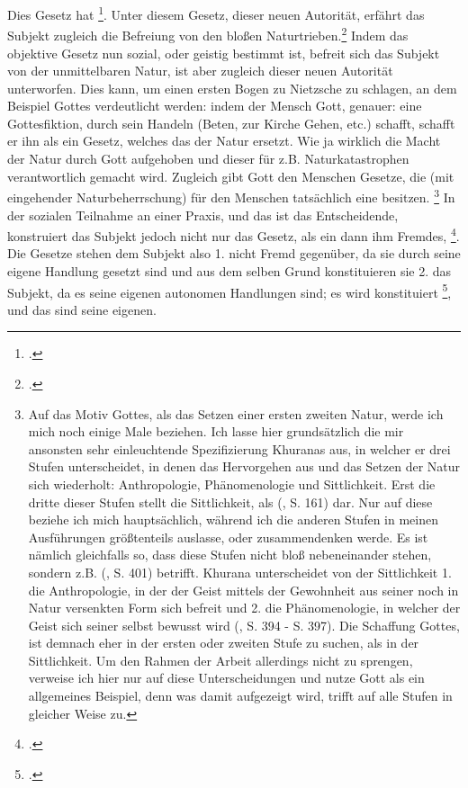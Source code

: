 \documentclass[12pt, a4paper, openany]{report}
\begin{document}
Dies Gesetz hat \footcite[][§146, S. 164.]{hegel_grundlinien_2017}.
Unter diesem Gesetz, dieser neuen Autorität, erfährt das Subjekt zugleich die Befreiung von den bloßen Naturtrieben.\footcite[Vlg.][§149, S. 164]{hegel_grundlinien_2017} 
Indem das objektive Gesetz nun sozial, oder geistig bestimmt ist, befreit sich das Subjekt von der unmittelbaren Natur, ist aber zugleich dieser neuen Autorität unterworfen. 
Dies kann, um einen ersten Bogen zu Nietzsche zu schlagen, an dem Beispiel Gottes verdeutlicht werden: 
indem der Mensch Gott, genauer: eine Gottesfiktion, durch sein Handeln (Beten, zur Kirche Gehen, etc.) schafft, schafft er ihn als ein Gesetz, welches das der Natur ersetzt. 
Wie ja wirklich die Macht der Natur durch Gott aufgehoben und dieser für z.B. Naturkatastrophen verantwortlich gemacht wird.
Zugleich gibt Gott den Menschen Gesetze, die (mit eingehender Naturbeherrschung) für den Menschen tatsächlich eine  besitzen.
\footnote{
    Auf das Motiv Gottes, als das Setzen einer ersten zweiten Natur, werde ich mich noch einige Male beziehen. 
    Ich lasse hier grundsätzlich die mir ansonsten sehr einleuchtende Spezifizierung Khuranas aus, in welcher er drei Stufen unterscheidet, in denen das Hervorgehen aus und das Setzen der Natur sich wiederholt: Anthropologie, Phänomenologie und Sittlichkeit.
    Erst die dritte dieser Stufen stellt die Sittlichkeit, als  (\cite{hegel_grundlinien_2017}, S. 161) dar.
    Nur auf diese beziehe ich mich hauptsächlich, während ich die anderen Stufen in meinen Ausführungen größtenteils auslasse, oder zusammendenken werde. 
    Es ist nämlich gleichfalls so, dass diese Stufen nicht bloß nebeneinander stehen, sondern z.B.  (\cite{khurana_freiheit_2017}, S. 401) betrifft.
    Khurana unterscheidet von der Sittlichkeit 1. die Anthropologie, in der der Geist mittels der Gewohnheit aus seiner noch in Natur versenkten Form sich befreit und 2. die Phänomenologie, in welcher der Geist sich seiner selbst bewusst wird (\cite{khurana_freiheit_2017}, S. 394 - S. 397).
    Die Schaffung Gottes, ist demnach eher in der ersten oder zweiten Stufe zu suchen, als in der Sittlichkeit. 
    Um den Rahmen der Arbeit allerdings nicht zu sprengen, verweise ich hier nur auf diese Unterscheidungen und nutze Gott als ein allgemeines Beispiel, denn was damit aufgezeigt wird, trifft auf alle Stufen in gleicher Weise zu. 
}
In der sozialen Teilnahme an einer Praxis, und das ist das Entscheidende, konstruiert das Subjekt jedoch nicht nur das Gesetz, als ein dann ihm Fremdes, \footcite[][§147, S. 162.]{hegel_grundlinien_2017}.
Die Gesetze stehen dem Subjekt also 1. nicht Fremd gegenüber, da sie durch seine eigene Handlung gesetzt sind und aus dem selben Grund konstituieren sie 2. das Subjekt, da es seine eigenen autonomen Handlungen sind;
es wird konstituiert \footcite[][30]{menke_autonomie_2018}, und das sind seine eigenen.
\end{document}
